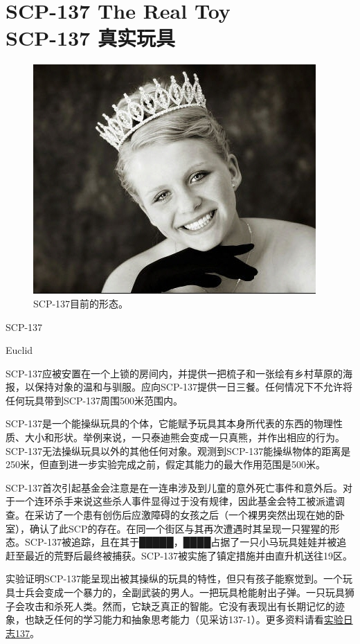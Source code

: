 \chapter[SCP-137 真实玩具]{
    SCP-137 The Real Toy\\
    SCP-137 真实玩具
}

\label{chap:SCP-137}

\begin{figure}[H]
    \centering
    \includegraphics[width=0.5\linewidth]{images/SCP.137.jpg}
    \caption*{SCP-137目前的形态。}
\end{figure}

SCP-137

Euclid

SCP-137应被安置在一个上锁的房间内，并提供一把梳子和一张绘有乡村草原的海报，以保持对象的温和与驯服。应向SCP-137提供一日三餐。任何情况下不允许将任何玩具带到SCP-137周围500米范围内。

SCP-137是一个能操纵玩具的个体，它能赋予玩具其本身所代表的东西的物理性质、大小和形状。举例来说，一只泰迪熊会变成一只真熊，并作出相应的行为。SCP-137无法操纵玩具以外的其他任何对象。观测到SCP-137能操纵物体的距离是250米，但直到进一步实验完成之前，假定其能力的最大作用范围是500米。

SCP-137首次引起基金会注意是在一连串涉及到儿童的意外死亡事件和意外后。对于一个连环杀手来说这些杀人事件显得过于没有规律，因此基金会特工被派遣调查。在采访了一个患有创伤后应激障碍的女孩之后（一个裸男突然出现在她的卧室），确认了此SCP的存在。在同一个街区与其再次遭遇时其呈现一只猩猩的形态。SCP-137被追踪，且在其于█████，████占据了一只小马玩具娃娃并被追赶至最近的荒野后最终被捕获。SCP-137被实施了镇定措施并由直升机送往19区。

实验证明SCP-137能呈现出被其操纵的玩具的特性，但只有孩子能察觉到。一个玩具士兵会变成一个暴力的，全副武装的男人。一把玩具枪能射出子弹。一只玩具狮子会攻击和杀死人类。然而，它缺乏真正的智能。它没有表现出有长期记忆的迹象，也缺乏任何的学习能力和抽象思考能力（见采访137-1）。更多资料请看\hyperref[sec:DOC-experiment-log-137]{实验日志137}。

